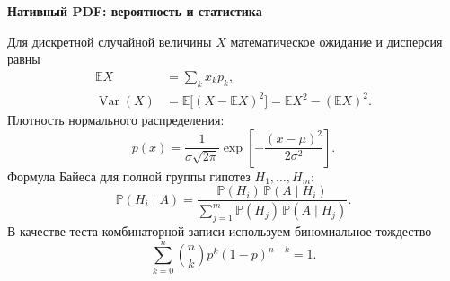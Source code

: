 \documentclass[11pt,a4paper]{article}
\begin{document}
\newpage
\begin{center}
{\Large\bfseries Нативный PDF: вероятность и статистика}
\end{center}

Для дискретной случайной величины $X$ математическое ожидание и дисперсия равны
\begin{align}
 \mathbb{E}X &= \sum_k x_k p_k, \tag{N.10}\\
 \operatorname{Var}(X) &= \mathbb{E}\bigl[(X-\mathbb{E}X)^2\bigr]
 =\mathbb{E}X^2-(\mathbb{E}X)^2. \tag{N.11}
\end{align}
Плотность нормального распределения:
\begin{equation}
 p(x)=\frac{1}{\sigma\sqrt{2\pi}}
 \exp\!\left[-\frac{(x-\mu)^2}{2\sigma^2}\right].
 \tag{N.12}
\end{equation}
Формула Байеса для полной группы гипотез $H_1,\ldots,H_m$:
\begin{equation}
 \mathbb{P}(H_i\mid A)=
 \frac{\mathbb{P}(H_i)\,\mathbb{P}(A\mid H_i)}
 {\sum_{j=1}^{m}\mathbb{P}(H_j)\,\mathbb{P}(A\mid H_j)}.
 \tag{N.13}
\end{equation}
В качестве теста комбинаторной записи используем биномиальное тождество
\begin{equation}
 \sum_{k=0}^{n}\binom{n}{k}p^k(1-p)^{n-k}=1.
 \tag{N.14}
\end{equation}
\end{document}
